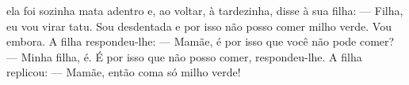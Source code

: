 

 ela foi sozinha mata
adentro e, ao voltar, à
tardezinha, disse à sua filha:\break
--- Filha, eu vou virar tatu. Sou
desdentada e por isso não posso
comer milho verde. Vou embora.
A filha respondeu-lhe:\break
--- Mamãe, é por isso que
você não pode comer?\break
--- Minha filha, é. É por isso que
não posso comer, respondeu-lhe.
A filha replicou:\break
--- Mamãe, então coma
só milho verde!

\vspace{2em}

